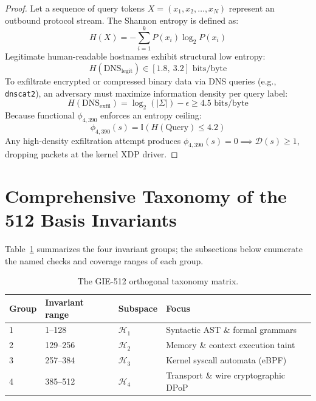 \documentclass{portalciencia}
\theoremstyle{plain}
\theoremstyle{definition}
\begin{document}
\begin{proof}
Let a sequence of query tokens $X = (x_1, x_2, \dots, x_N)$ represent an outbound protocol stream. The Shannon entropy is defined as:
\begin{equation}
\label{eq:shannon}
H(X) = -\sum_{i=1}^{k} P(x_{i}) \log_{2} P(x_{i})
\end{equation}
Legitimate human-readable hostnames exhibit structural low entropy:
\begin{equation}
\label{eq:dnslegit}
H(\mathrm{DNS}_{\mathrm{legit}}) \in [1.8,\ 3.2] \text{ bits/byte}
\end{equation}
To exfiltrate encrypted or compressed binary data via DNS queries (e.g., \texttt{dnscat2}), an adversary must maximize information density per query label:
\begin{equation}
\label{eq:dnsexfil}
H(\mathrm{DNS}_{\mathrm{exfil}}) = \log_{2}(|\Sigma|) - \epsilon \ge 4.5 \text{ bits/byte}
\end{equation}
Because functional $\phi_{4,390}$ enforces an entropy ceiling:
\begin{equation}
\label{eq:entropygate}
\phi_{4,390}(s) = \mathbb{I}\left( H(\mathrm{Query}) \le 4.2 \right)
\end{equation}
Any high-density exfiltration attempt produces $\phi_{4,390}(s) = 0 \implies \mathcal{D}(s) \ge 1$, dropping packets at the kernel XDP driver.
\end{proof}

\section{Comprehensive Taxonomy of the 512 Basis Invariants}

Table~\ref{tab:taxonomy} summarizes the four invariant groups; the subsections below enumerate the named checks and coverage ranges of each group.

\begin{table}[ht]
\centering
\caption{The GIE-512 orthogonal taxonomy matrix.}
\label{tab:taxonomy}
\begin{tabular}{llll}
\toprule
Group & Invariant range & Subspace & Focus \\
\midrule
1 & 1--128 & $\mathcal{H}_1$ & Syntactic AST \& formal grammars \\
2 & 129--256 & $\mathcal{H}_2$ & Memory \& context execution taint \\
3 & 257--384 & $\mathcal{H}_3$ & Kernel syscall automata (eBPF) \\
4 & 385--512 & $\mathcal{H}_4$ & Transport \& wire cryptographic DPoP \\
\bottomrule
\end{tabular}
\end{table}
\end{document}
